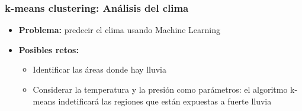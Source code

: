 \documentclass[10pt]{beamer}
\begin{document}
\begin{frame}
\frametitle{k-means clustering: An\'alisis del clima}
\begin{beamerboxesrounded}[upper=uppercolor, lower=lowercolor, shadow=true]{} 

\begin{itemize}
 \item \textbf{Problema:} predecir el clima usando Machine Learning
 \item \textbf{Posibles retos:}
   \begin{itemize}
     \item Identificar las \'areas donde hay lluvia
     \item Considerar la temperatura y la presi\'on como par\'ametros: el algoritmo k-means indetificar\'a las regiones que est\'an expuestas a fuerte lluvia 
   \end{itemize}
    
\end{itemize}
\end{beamerboxesrounded}

%
%
\end{frame}
\end{document}
